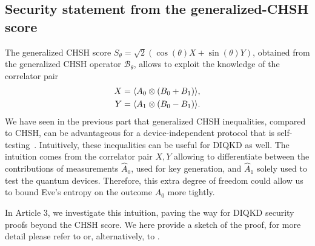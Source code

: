 \subsection{Security statement from the generalized-CHSH score}
\label{sec:Pavel}

The generalized CHSH score $S_\theta=\sqrt{2}(\cos(\theta)X+\sin(\theta)Y)$, obtained from the generalized CHSH operator $\mathcal{B}_\theta$, allows to exploit the knowledge of the correlator pair
\begin{equation}
	\begin{split}
		X = \langle {A_0 \otimes (B_0+B_1)} \rangle,\\
		Y = \langle {A_1 \otimes (B_0-B_1)} \rangle.
	\end{split}
\end{equation}
We have seen in the previous part that generalized CHSH inequalities, compared to CHSH, can be advantageous for a device-independent protocol that is self-testing~\cite{Valcarce2022}.
Intuitively, these inequalities can be useful for DIQKD as well.
The intuition comes from the correlator pair $X,Y$ allowing to differentiate between the contributions of measurements $\hat{A}_0$, used for key generation, and $\hat{A}_1$ solely used to test the quantum devices.
Therefore, this extra degree of freedom could allow us to bound Eve's entropy on the outcome $A_0$ more tightly.

In Article 3, we investigate this intuition, paving the way for DIQKD security proofs beyond the CHSH score. 
We here provide a sketch of the proof, for more detail please refer to \cite{Sekatski2021} or, alternatively, to \cite{Woodhead2021}.


\medbreak

